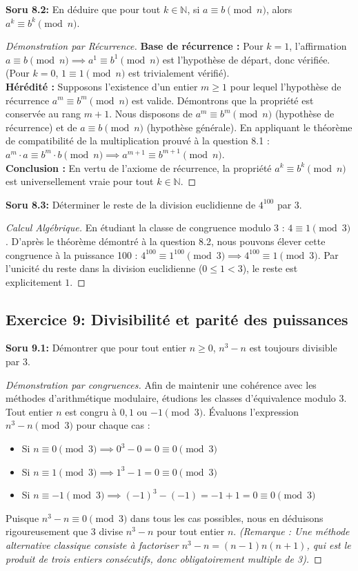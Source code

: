 \documentclass[12pt,a4paper]{report}
\begin{document}
\textbf{Soru 8.2:} En déduire que pour tout $k \in \mathbb{N}$, si $a \equiv b \pmod{n}$, alors $a^k \equiv b^k \pmod{n}$.
\begin{proof}[Démonstration par Récurrence]
\textbf{Base de récurrence :} Pour $k=1$, l'affirmation $a \equiv b \pmod n \implies a^1 \equiv b^1 \pmod n$ est l'hypothèse de départ, donc vérifiée. (Pour $k=0$, $1 \equiv 1 \pmod n$ est trivialement vérifié). \\
\textbf{Hérédité :} Supposons l'existence d'un entier $m \geq 1$ pour lequel l'hypothèse de récurrence $a^m \equiv b^m \pmod{n}$ est valide.
Démontrons que la propriété est conservée au rang $m+1$.
Nous disposons de $a^m \equiv b^m \pmod{n}$ (hypothèse de récurrence) et de $a \equiv b \pmod{n}$ (hypothèse générale).
En appliquant le théorème de compatibilité de la multiplication prouvé à la question 8.1 :
$a^m \cdot a \equiv b^m \cdot b \pmod{n} \implies a^{m+1} \equiv b^{m+1} \pmod{n}$. \\
\textbf{Conclusion :} En vertu de l'axiome de récurrence, la propriété $a^k \equiv b^k \pmod{n}$ est universellement vraie pour tout $k \in \mathbb{N}$.
\end{proof}

\textbf{Soru 8.3:} Déterminer le reste de la division euclidienne de $4^{100}$ par $3$.
\begin{proof}[Calcul Algébrique]
En étudiant la classe de congruence modulo 3 : $4 \equiv 1 \pmod{3}$.
D'après le théorème démontré à la question 8.2, nous pouvons élever cette congruence à la puissance 100 :
$4^{100} \equiv 1^{100} \pmod{3} \implies 4^{100} \equiv 1 \pmod{3}$.
Par l'unicité du reste dans la division euclidienne ($0 \leq 1 < 3$), le reste est explicitement $1$.
\end{proof}

\subsection*{Exercice 9: Divisibilité et parité des puissances}
\textbf{Soru 9.1:} Démontrer que pour tout entier $n \geq 0$, $n^3 - n$ est toujours divisible par 3.
\begin{proof}[Démonstration par congruences]
Afin de maintenir une cohérence avec les méthodes d'arithmétique modulaire, étudions les classes d'équivalence modulo 3. Tout entier $n$ est congru à $0, 1$ ou $-1 \pmod 3$. 
Évaluons l'expression $n^3 - n \pmod 3$ pour chaque cas :
\begin{itemize}
    \item Si $n \equiv 0 \pmod 3 \implies 0^3 - 0 = 0 \equiv 0 \pmod 3$
    \item Si $n \equiv 1 \pmod 3 \implies 1^3 - 1 = 0 \equiv 0 \pmod 3$
    \item Si $n \equiv -1 \pmod 3 \implies (-1)^3 - (-1) = -1 + 1 = 0 \equiv 0 \pmod 3$
\end{itemize}
Puisque $n^3 - n \equiv 0 \pmod 3$ dans tous les cas possibles, nous en déduisons rigoureusement que 3 divise $n^3 - n$ pour tout entier $n$.
\textit{(Remarque : Une méthode alternative classique consiste à factoriser $n^3 - n = (n-1)n(n+1)$, qui est le produit de trois entiers consécutifs, donc obligatoirement multiple de 3).}
\end{proof}
\end{document}
